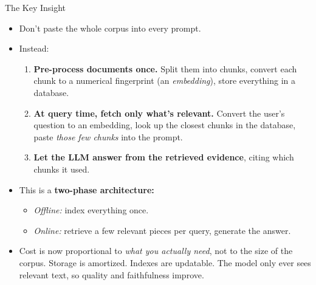 \documentclass[10pt,english,aspectratio=169]{beamer}
\begin{document}
\begin{frame}{The Key Insight}
\begin{itemize}
\item Don't paste the whole corpus into every prompt.

\medskip
\item Instead:
\begin{enumerate}
    \item \textbf{Pre-process documents once.} Split them into chunks, convert each chunk to a numerical fingerprint (an \emph{embedding}), store everything in a database.
    \item \textbf{At query time, fetch only what's relevant.} Convert the user's question to an embedding, look up the closest chunks in the database, paste \emph{those few chunks} into the prompt.
    \item \textbf{Let the LLM answer from the retrieved evidence}, citing which chunks it used.
\end{enumerate}

\medskip
\item This is a \textbf{two-phase architecture:}
\begin{itemize}
    \item \emph{Offline:} index everything once.
    \item \emph{Online:} retrieve a few relevant pieces per query, generate the answer.
\end{itemize}

\medskip
\item Cost is now proportional to \emph{what you actually need}, not to the size of the corpus. Storage is amortized. Indexes are updatable. The model only ever sees relevant text, so quality and faithfulness improve.
\end{itemize}
\end{frame}
\end{document}
